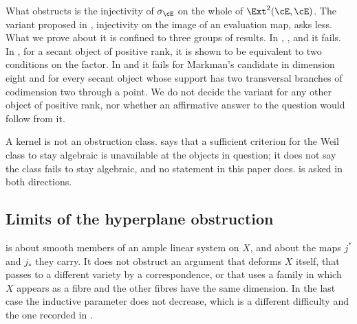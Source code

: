 \begin{remark}\label{rem:weakerscope}
What \cite[Corollary~9.18]{paperI} obstructs is the injectivity of $\sigma_{\cE}$ on the
whole of $\Ext^{2}(\cE,\cE)$. The variant proposed in
\cite[Question 11.4]{Mar25b}, injectivity on the image of an evaluation map,
asks less. What we prove about it is confined to three groups of results.
In \cite[Theorem~9.19]{paperI}, , \cite[Theorem~9.20]{paperI} and
 it fails. In , for a secant object of
positive rank, it is shown to be equivalent to two conditions on the factor.
In  and  it fails for
Markman's candidate in dimension eight and for every secant object whose
support has two transversal branches of codimension two through a point. We
do not decide the variant for any other object of positive rank, nor whether
an affirmative answer to the question would follow from it.
\end{remark}

\begin{remark}\label{rem:notnondeform}
A kernel is not an obstruction class. \cite[Corollary~9.18]{paperI} says that a sufficient
criterion for the Weil class to stay algebraic is unavailable at the objects
in question; it does not say the class fails to stay algebraic, and no
statement in this paper does. \cite[Question~15.13]{paperI} is asked in both
directions.
\end{remark}

\subsection{Limits of the hyperplane obstruction}

\begin{remark}%
\label{rem:notlinear}
\cite[Theorem~10.3]{paperI} is about smooth members of an ample linear system on
$X$, and about the maps $j^{*}$ and $j_{*}$ they carry. It does not obstruct
an argument that deforms $X$ itself, that passes to a different variety by a
correspondence, or that uses a family in which $X$ appears as a fibre and the
other fibres have the same dimension. In the last case the inductive parameter
does not decrease, which is a different difficulty and the one recorded in
\cite[Remark~10.10]{paperI}.
\end{remark}

